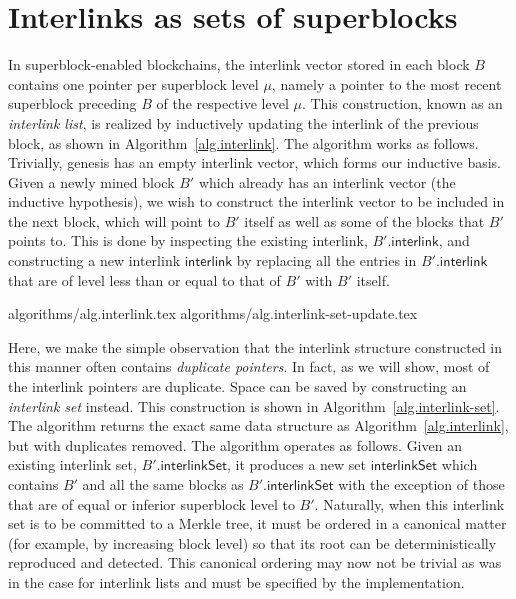 \section{Interlinks as sets of superblocks}\label{sec.construction}

In superblock-enabled blockchains, the interlink vector stored in each block $B$
contains one pointer per superblock level $\mu$, namely a pointer to the most
recent superblock preceding $B$ of the respective level $\mu$. This
construction, known as an \emph{interlink list}, is realized by inductively
updating the interlink of the previous block, as shown in
Algorithm~\ref{alg.interlink}. The algorithm works as follows. Trivially,
genesis has an empty interlink vector, which forms our inductive basis. Given a
newly mined block $B'$ which already has an interlink vector (the inductive
hypothesis), we wish to construct the interlink vector to be included in the
next block, which will point to $B'$ itself as well as some of the blocks that
$B'$ points to. This is done by inspecting the existing interlink,
$B'.\textsf{interlink}$, and constructing a new interlink $\textsf{interlink}$
by replacing all the entries in $B'.\textsf{interlink}$ that are of level less
than or equal to that of $B'$ with $B'$ itself.

{algorithms/alg.interlink.tex}
{algorithms/alg.interlink-set-update.tex}

Here, we make the simple observation that the interlink structure
constructed in this manner often contains \emph{duplicate pointers}. In fact, as
we will show, most of the interlink pointers are duplicate. Space can be saved
by constructing an \emph{interlink set} instead. This construction is shown in
Algorithm~\ref{alg.interlink-set}. The algorithm returns the exact same data
structure as Algorithm~\ref{alg.interlink}, but with duplicates removed. The
algorithm operates as follows. Given an existing interlink set,
$B'.\textsf{interlinkSet}$, it produces a new set $\textsf{interlinkSet}$ which
contains $B'$ and all the same blocks as $B'.\textsf{interlinkSet}$ with the
exception of those that are of equal or inferior superblock level to $B'$.
Naturally, when this interlink set is to be committed to a Merkle tree, it must
be ordered in a canonical matter (for example, by increasing block level) so
that its root can be deterministically reproduced and detected. This canonical
ordering may now not be trivial as was in the case for interlink lists and must
be specified by the implementation.

